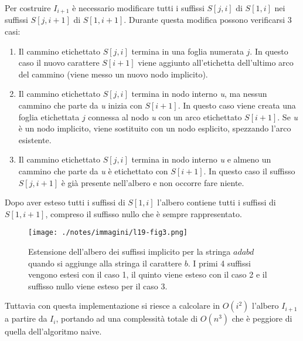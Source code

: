 Per costruire $ I_{i+1} $ è necessario modificare tutti i suffissi $ S[j,i] $ di $ S[1,i] $ nei suffissi $ S[j,i+1] $ di $ S[1,i+1] $.
Durante questa modifica possono verificarsi 3 casi:

\begin{enumerate}
	\item Il cammino etichettato $ S[j,i] $ termina in una foglia numerata $ j $. In questo caso il nuovo carattere $ S[i+1] $ viene aggiunto all'etichetta dell'ultimo arco del cammino (viene messo un nuovo nodo implicito).
	\item Il cammino etichettato $ S[j,i] $ termina in nodo interno \textit{u}, ma nessun cammino che parte da \textit{u} inizia con $ S[i+1] $. In questo caso viene creata una foglia etichettata $ j $ connessa al nodo \textit{u} con un arco etichettato $ S[i+1] $. Se \textit{u} è un nodo implicito, viene sostituito con un nodo esplicito, spezzando l'arco esistente.
	\item Il cammino etichettato $ S[j,i] $ termina in nodo interno \textit{u} e almeno un cammino che parte da \textit{u} è etichettato con $ S[i+1] $. In questo caso il suffisso $ S[j,i+1] $ è già presente nell'albero e non occorre fare niente.
\end{enumerate}

Dopo aver esteso tutti i suffissi di $ S[1,i] $ l'albero contiene tutti i suffissi di $ S[1,i+1] $, compreso il suffisso nullo che è sempre rappresentato.

\begin{figure}[htbp]
	\centering
	\texttt{[image: ./notes/immagini/l19-fig3.png]}
	\caption{Estensione dell'albero dei suffissi implicito per la stringa $ adabd $ quando si aggiunge alla stringa il carattere $ b $. I primi 4 suffissi vengono estesi con il caso 1, il quinto viene esteso con il caso 2 e il suffisso nullo viene esteso per il caso 3.}
\end{figure}

Tuttavia con questa implementazione si riesce a calcolare in $ O(i^2) $ l'albero $ I_{i+1} $ a partire da $ I_i $, portando ad una complessità totale di $ O(n^3) $ che è peggiore di quella dell'algoritmo naive.
